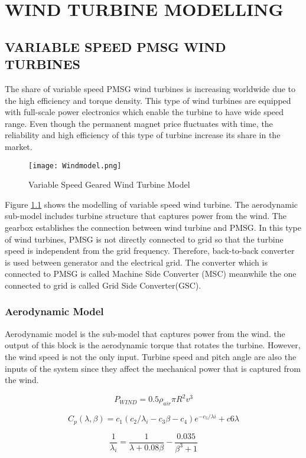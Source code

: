 \chapter{WIND TURBINE MODELLING}
\label{chp:3}

\section{VARIABLE SPEED PMSG WIND TURBINES}

The share of variable speed PMSG wind turbines is increasing worldwide due to the high efficiency and torque density. This type of wind turbines are equipped with full-scale power electronics which enable the turbine to have wide speed range. Even though the permanent magnet price fluctuates with time, the reliability and high efficiency of this type of turbine increase its share in the market. \\

 

\begin{figure}[h!]
	\centering
	\texttt{[image: Windmodel.png]}
	\caption{Variable Speed Geared Wind Turbine Model}
	\label{varspeedpmsg}
\end{figure} 

Figure \ref{varspeedpmsg} shows the modelling of variable speed wind turbine. The aerodynamic sub-model includes turbine structure that captures power from the wind. The gearbox establishes the connection between wind turbine and PMSG. In this type of wind turbines, PMSG is not directly connected to grid so that the turbine speed is independent from the grid frequency. Therefore, back-to-back converter is used between generator and the electrical grid. The converter which is connected to PMSG is called Machine Side Converter (MSC) meanwhile the one connected to grid is called Grid Side Converter(GSC).

\subsection{Aerodynamic Model}
Aerodynamic model is the sub-model that captures power from the wind. the output of this block is the aerodynamic torque that rotates the turbine. However, the wind speed is not the only input. Turbine speed and pitch angle are also the inputs of the system since they affect the mechanical power that is captured from the wind.

\begin{equation}
P_{WIND}=0.5\rho_{air}\pi R^{2} v^{3}
\label{windpower}
\end{equation}

\begin{equation}
C_{p}(\lambda,\beta)=c_{1}(c_{2}/\lambda_{i}-c_{3}\beta-c_{4})e^{-c_{5}/\lambda{i}}+c{6}\lambda
\label{cp}
\end{equation}

\begin{equation}
\frac{1}{\lambda_{i}}=\frac{1}{\lambda+0.08\beta}-\frac{0.035}{\beta^{3}+1} 
\label{lambdai}
\end{equation}